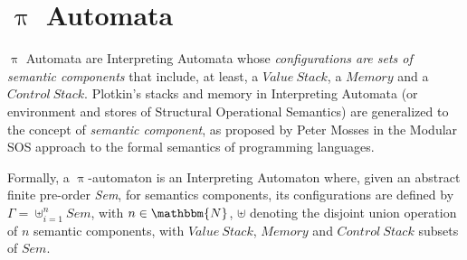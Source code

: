 \documentclass[a4paper,openany]{book}
\begin{document}
\section{$\uppi$ Automata}

$\uppi$ Automata are Interpreting Automata
whose \emph{configurations are sets of semantic components} that include, at least, 
a $\mathit{Value~Stack}$, a $\mathit{Memory}$ and a $\mathit{Control~Stack}$.
Plotkin's stacks and memory in
Interpreting Automata (or environment and stores of Structural
Operational Semantics) are generalized to the concept of \emph{semantic
  component}, as proposed by Peter Mosses in the Modular
SOS approach to the formal semantics of
programming languages.

Formally, a $\uppi$-automaton is an Interpreting Automaton where, given an abstract finite pre-order \emph{Sem}, for semantics components, its configurations are defined by $\Gamma = \uplus^n_{i=1} \mathit{Sem}$, with $n
\in \mathbbm{N}$, $\uplus$ denoting the disjoint union operation of
$n$ semantic components, with $\mathit{Value~Stack}$, $\mathit{Memory}$ and $\mathit{Control~Stack}$ subsets of $\mathit{Sem}$.
%

\end{document}
